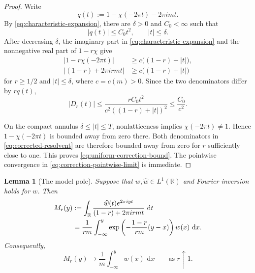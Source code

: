 \documentclass[10pt,reqno,a4paper]{amsart}
\numberwithin{equation}{section}
\theoremstyle{plain}
\newtheorem{lemma}[theorem]{Lemma}
\theoremstyle{definition}
\theoremstyle{remark}
\newcommand{\R}{\mathbb{R}}
\newcommand{\1}{\mathbf{1}}
\newcommand{\de}{\,\mathrm{d}}
\newcommand{\abs}[1]{\left|#1\right|}
\begin{document}
\begin{proof}
  Write
  \begin{equation*}
    q(t):=1-\chi(-2\pi t)-2\pi i mt.
  \end{equation*}
  By \cref{eq:characteristic-expansion}, there are \(\delta>0\) and
  \(C_0<\infty\) such that
  \begin{equation}\label{eq:q-quadratic}
    \abs{q(t)}\leq C_0t^2,
    \qquad \abs t\leq\delta.
  \end{equation}
  After decreasing \(\delta\), the imaginary part in
  \cref{eq:characteristic-expansion} and the nonnegative real part of
  \(1-r\chi\) give
  \begin{align}
    \abs{1-r\chi(-2\pi t)}
    &\geq c\bigl((1-r)+\abs t\bigr), \label{eq:true-denominator-lower}\\
    \abs{(1-r)+2\pi i rmt}
    &\geq c\bigl((1-r)+\abs t\bigr) \label{eq:model-denominator-lower}
  \end{align}
  for \(r\geq1/2\) and \(\abs t\leq\delta\), where \(c=c(m)>0\).
  Since the two denominators differ by \(rq(t)\),
  \begin{equation*}
    \abs{D_r(t)}
    \leq
    \frac{rC_0t^2}
    {c^2((1-r)+\abs t)^2}
    \leq \frac{C_0}{c^2}.
  \end{equation*}

  On the compact annulus \(\delta\leq\abs t\leq T\), nonlatticeness implies
  \(\chi(-2\pi t)\neq1\).  Hence \(1-\chi(-2\pi t)\) is bounded away from zero
  there.  Both denominators in \cref{eq:corrected-resolvent} are therefore
  bounded away from zero for \(r\) sufficiently close to one.  This proves
  \cref{eq:uniform-correction-bound}.  The pointwise convergence in
  \cref{eq:correction-pointwise-limit} is immediate.
\end{proof}

\begin{lemma}[The model pole]\label{lem:model-pole}
  Suppose that \(w,\widehat w\in L^1(\R)\) and Fourier inversion holds for
  \(w\).  Then
  \begin{align}
    M_r(y)
    &:=
    \int_\R
    \frac{\widehat w(t)e^{2\pi iyt}}
         {(1-r)+2\pi i rmt}
    \,\de t \notag\\
    &=
    \frac{1}{rm}
    \int_{-\infty}^{y}
    \exp\left(
      -\frac{1-r}{rm}(y-x)
    \right)
    w(x)\,\de x. \label{eq:model-pole-formula}
  \end{align}
  Consequently,
  \begin{equation}\label{eq:model-pole-limit}
    M_r(y)\longrightarrow
    \frac{1}{m}\int_{-\infty}^{y}w(x)\,\de x
    \qquad\text{as }r\uparrow1.
  \end{equation}
\end{lemma}
\end{document}

